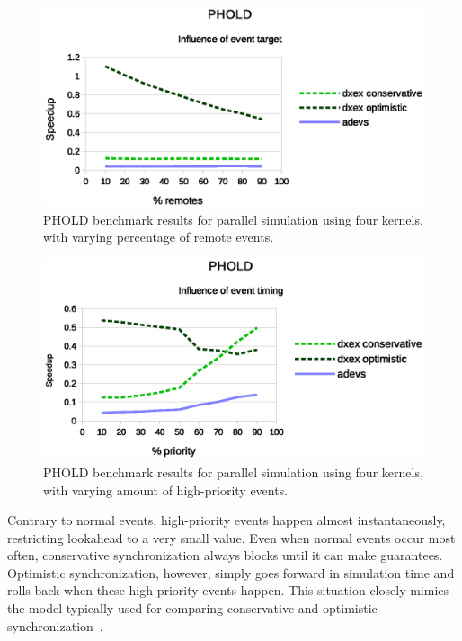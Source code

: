\begin{figure}
    \center
    \includegraphics[width=\columnwidth]{fig/phold_remotes.eps}
    \caption{PHOLD benchmark results for parallel simulation using four kernels, with varying percentage of remote events.}
\end{figure}

\begin{figure}
	\center
	\includegraphics[width=\columnwidth]{fig/phold_priority.eps}
	\caption{PHOLD benchmark results for parallel simulation using four kernels, with varying amount of high-priority events.}
	\label{fig:phold_priority}
\end{figure}

Contrary to normal events, high-priority events happen almost instantaneously, restricting lookahead to a very small value.
Even when normal events occur most often, conservative synchronization always blocks until it can make guarantees.
Optimistic synchronization, however, simply goes forward in simulation time and rolls back when these high-priority events happen.
This situation closely mimics the model typically used for comparing conservative and optimistic synchronization~\cite{FujimotoBook}.

